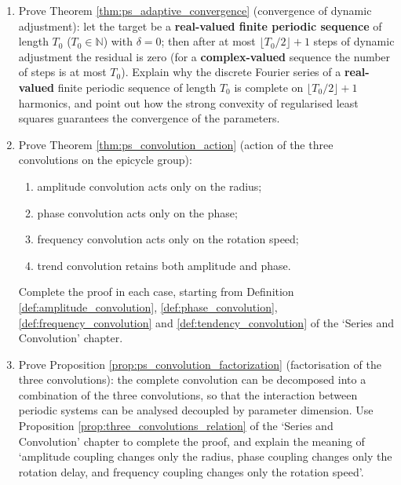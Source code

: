 \begin{enumerate}[leftmargin=3em, label=\textbf{Exercise \arabic*}]
    \item Prove Theorem \ref{thm:ps_adaptive_convergence} (convergence of dynamic adjustment):
    let the target be a \textbf{real-valued finite periodic sequence} of length $T_0$ ($T_0\in\mathbb N$) with $\delta=0$;
    then after at most $\lfloor T_0/2\rfloor+1$ steps of dynamic adjustment the residual is zero
    (for a \textbf{complex-valued} sequence the number of steps is at most $T_0$).
    Explain why the discrete Fourier series of a \textbf{real-valued} finite periodic sequence of length $T_0$ is complete on
    $\lfloor T_0/2\rfloor+1$ harmonics,
    and point out how the strong convexity of regularised least squares guarantees the convergence of the parameters.

    \item Prove Theorem \ref{thm:ps_convolution_action} (action of the three convolutions on the epicycle group):
    \begin{enumerate}[label=(\roman*)]
        \item amplitude convolution acts only on the radius;
        \item phase convolution acts only on the phase;
        \item frequency convolution acts only on the rotation speed;
        \item trend convolution retains both amplitude and phase.
    \end{enumerate}
    Complete the proof in each case, starting from Definition \ref{def:amplitude_convolution},
    \ref{def:phase_convolution}, \ref{def:frequency_convolution} and
    \ref{def:tendency_convolution} of the `Series and Convolution' chapter.

    \item Prove Proposition \ref{prop:ps_convolution_factorization} (factorisation of the three convolutions):
    the complete convolution can be decomposed into a combination of the three convolutions,
    so that the interaction between periodic systems can be analysed decoupled by parameter dimension.
    Use Proposition \ref{prop:three_convolutions_relation} of the `Series and Convolution' chapter
    to complete the proof, and explain the meaning of `amplitude coupling changes only the radius,
    phase coupling changes only the rotation delay, and frequency coupling changes only the rotation speed'.


\end{enumerate}
